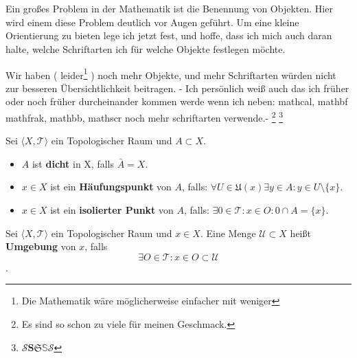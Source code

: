 \chapter{}
Ein großes Problem in der Mathematik ist die Benennung von Objekten.
Hier wird einem diese Problem deutlich vor Augen geführt.
Um eine kleine Orientierung zu bieten lege ich jetzt fest, und hoffe, dass
ich mich auch daran halte, welche Schriftarten ich für welche Objekte festlegen
möchte.

Wir haben ( leider\footnote{Die Mathematik wäre möglicherweise einfacher mit weniger} ) 
noch mehr Objekte, und mehr Schriftarten würden nicht zur besseren
Übersichtlichkeit beitragen.  - Ich persönlich weiß auch das ich früher 
oder noch früher durcheinander kommen werde wenn ich neben:
mathcal{}, mathbf{} mathfrak{}, mathbb{}, mathscr{} noch mehr schriftarten verwende.-
\footnote{ Es sind so schon zu viele für meinen Geschmack.}
\footnote{$\mathcal{S} \mathbf{S} \mathfrak{S} \mathbb{S} \mathscr{S}$} 


{
    Sei $\langle X, \mathcal{T}\rangle$ ein Topologischer Raum und $A \subset X$.
\begin{itemize}
    \item $A$ ist \textbf{dicht} in X, falls $\bar{A} = X$.
    \item $x \in X$ ist ein \textbf{Häufungspunkt} von $A$, falls:
     $\forall U \in \mathfrak U(x) \exists y \in A : y \in U \setminus \{ x \}$.
    \item $x \in X$ ist ein \textbf{isolierter Punkt} von $A$, falls:
     $\exists 0 \in \mathcal{T} : x \in O : 0 \cap A = \{x\}$.
\end{itemize}
}

{
    Sei $\langle X, \mathcal{T}\rangle$ ein Topologischer Raum und $x \in X$.
    Eine Menge $\mathcal{U} \subset X$ heißt \textbf{Umgebung} von $x$, falls
    $$
    \exists O \in \mathcal{T} : x \in O \subset \mathcal{U}
    $$.
}

